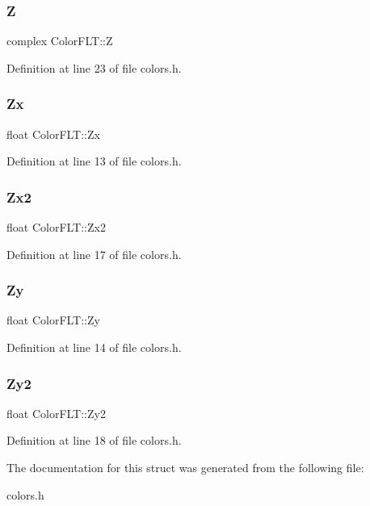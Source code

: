 \subsubsection{\texorpdfstring{Z}{Z}}
{\footnotesize\ttfamily complex Color\+F\+L\+T\+::Z}



Definition at line 23 of file colors.\+h.

\mbox{\label{struct_color_f_l_t_a70cc5d58d2522cdf732cf5d3756756f8}} 
\subsubsection{\texorpdfstring{Zx}{Zx}}
{\footnotesize\ttfamily float Color\+F\+L\+T\+::\+Zx}



Definition at line 13 of file colors.\+h.

\mbox{\label{struct_color_f_l_t_ab6416bbb2cc0ab236531be916e97bd66}} 
\subsubsection{\texorpdfstring{Zx2}{Zx2}}
{\footnotesize\ttfamily float Color\+F\+L\+T\+::\+Zx2}



Definition at line 17 of file colors.\+h.

\mbox{\label{struct_color_f_l_t_a644638d709023a61d56084c27e2f6f40}} 
\subsubsection{\texorpdfstring{Zy}{Zy}}
{\footnotesize\ttfamily float Color\+F\+L\+T\+::\+Zy}



Definition at line 14 of file colors.\+h.

\mbox{\label{struct_color_f_l_t_a533873f42823fa007535eccbcb1d95c1}} 
\subsubsection{\texorpdfstring{Zy2}{Zy2}}
{\footnotesize\ttfamily float Color\+F\+L\+T\+::\+Zy2}



Definition at line 18 of file colors.\+h.



The documentation for this struct was generated from the following file\+:\begin{DoxyCompactItemize}
\item 
colors.\+h\end{DoxyCompactItemize}
